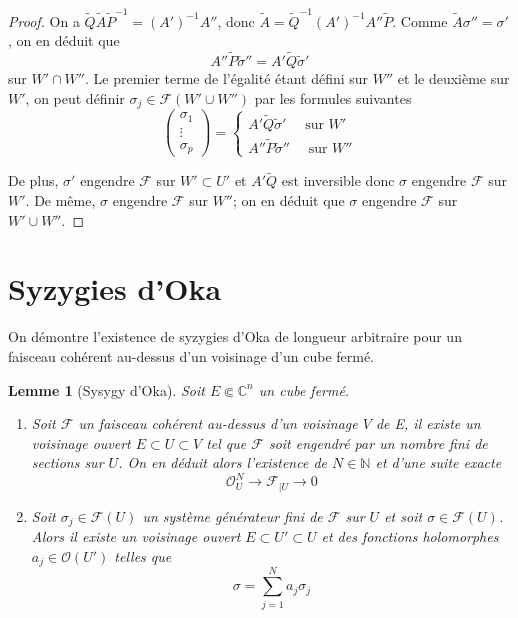 \documentclass{article}
\newtheorem{lemme}[theoreme]{Lemme}
\theoremstyle{definition}
\theoremstyle{remarque}
\begin{document}
\begin{proof}
On a $\tilde{Q}\tilde{A}\tilde{P}^{-1} = (A')^{-1}A''$, donc $\tilde{A} = \tilde{Q}^{-1}(A')^{-1}A''\tilde{P}$. Comme $\tilde{A}\sigma'' = \sigma'$, on en déduit que $$A''\tilde{P}\tilde{\sigma}''=A'\tilde{Q}\tilde{\sigma}'$$ sur $W' \cap W''$. Le premier terme de l'égalité étant défini sur $W''$ et le deuxième sur $W'$, on peut définir $\sigma_j \in \mathcal{F}(W'\cup W'')$ par les formules suivantes
\begin{equation*}
\begin{pmatrix}
   \sigma_1 \\ \vdots \\ \sigma_p
\end{pmatrix} = \left\{
\begin{array}{l}
  A'\tilde{Q}\tilde{\sigma}' \quad\text{ sur } W'\\
  A''\tilde{P}\tilde{\sigma}'' \quad\text{ sur } W''
\end{array}
\right.
\end{equation*}

De plus, $\sigma'$ engendre $\mathcal{F}$ sur $W' \subset U'$ et $A'\tilde{Q}$ est inversible donc $\sigma$ engendre $\mathcal{F}$ sur $W'$. De même, $\sigma$ engendre $\mathcal{F}$ sur $W''$; on en déduit que $\sigma$ engendre $\mathcal{F}$ sur $W'\cup W''$.
\end{proof}

\section{Syzygies d'Oka}

On démontre l'existence de syzygies d'Oka de longueur arbitraire pour un faisceau cohérent au-dessus d'un voisinage d'un cube fermé.

\begin{lemme}[Sysygy d'Oka]
Soit $E \Subset \mathbb{C}^n$ un cube fermé.
\begin{enumerate}
\item Soit $\mathcal{F}$ un faisceau cohérent au-dessus d'un voisinage $V$ de E, il existe un voisinage ouvert $E \subset U \subset V$ tel que $\mathcal{F}$ soit engendré par un nombre fini de sections sur $U$. On en déduit alors l'existence de $N \in \mathbb{N}$ et d'une suite exacte $$\mathcal{O}^N_U \to \mathcal{F}_{|U} \to 0$$
\item Soit $\sigma_j \in \mathcal{F}(U)$ un système générateur fini de $\mathcal{F}$ sur $U$ et  soit $\sigma \in \mathcal{F}(U)$. Alors il existe un voisinage ouvert $E \subset U' \subset U$ et des fonctions holomorphes $a_j \in \mathcal{O}(U')$ telles que $$\sigma = \sum_{j=1}^N a_j\sigma_j$$
\end{enumerate}
\end{lemme}
\end{document}
